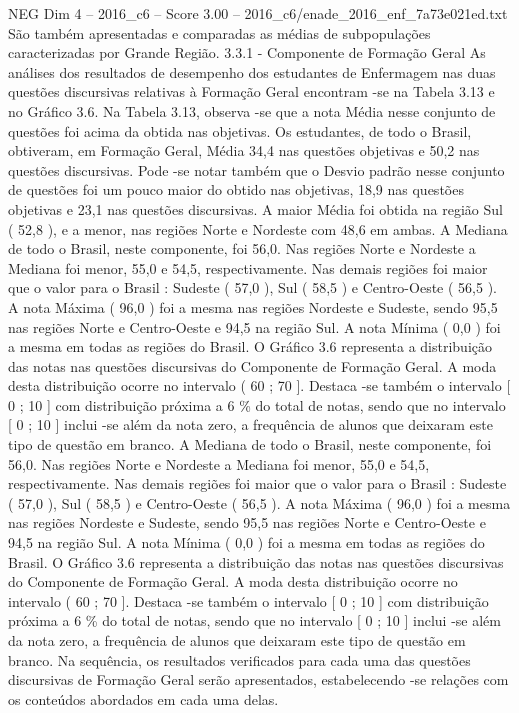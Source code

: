 \begin{textsample}{NEG Dim 4 – 2016\_c6 – Score 3.00 – 2016\_c6/enade\_2016\_enf\_7a73e021ed.txt}
São também apresentadas e comparadas as médias de subpopulações caracterizadas por Grande Região. 3.3.1 - Componente de Formação Geral As análises dos resultados de desempenho dos estudantes de Enfermagem nas duas questões discursivas relativas à Formação Geral encontram -se na Tabela 3.13 e no Gráfico 3.6.
Na Tabela 3.13, observa -se que a nota Média nesse conjunto de questões foi acima da obtida nas objetivas.
Os estudantes, de todo o Brasil, obtiveram, em Formação Geral, Média 34,4 nas questões objetivas e 50,2 nas questões discursivas.
Pode -se notar também que o Desvio padrão nesse conjunto de questões foi um pouco maior do obtido nas objetivas, 18,9 nas questões objetivas e 23,1 nas questões discursivas.
A maior Média foi obtida na região Sul ( 52,8 ), e a menor, nas regiões Norte e Nordeste com 48,6 em ambas.
A Mediana de todo o Brasil, neste componente, foi 56,0.
Nas regiões Norte e Nordeste a Mediana foi menor, 55,0 e 54,5, respectivamente.
Nas demais regiões foi maior que o valor para o Brasil : Sudeste ( 57,0 ), Sul ( 58,5 ) e Centro-Oeste ( 56,5 ).
A nota Máxima ( 96,0 ) foi a mesma nas regiões Nordeste e Sudeste, sendo 95,5 nas regiões Norte e Centro-Oeste e 94,5 na região Sul.
A nota Mínima ( 0,0 ) foi a mesma em todas as regiões do Brasil.
O Gráfico 3.6 representa a distribuição das notas nas questões discursivas do Componente de Formação Geral.
A moda desta distribuição ocorre no intervalo ( 60 ; 70 ].
Destaca -se também o intervalo [ 0 ; 10 ] com distribuição próxima a 6 \% do total de notas, sendo que no intervalo [ 0 ; 10 ] inclui -se além da nota zero, a frequência de alunos que deixaram este tipo de questão em branco.
A Mediana de todo o Brasil, neste componente, foi 56,0.
Nas regiões Norte e Nordeste a Mediana foi menor, 55,0 e 54,5, respectivamente.
Nas demais regiões foi maior que o valor para o Brasil : Sudeste ( 57,0 ), Sul ( 58,5 ) e Centro-Oeste ( 56,5 ).
A nota Máxima ( 96,0 ) foi a mesma nas regiões Nordeste e Sudeste, sendo 95,5 nas regiões Norte e Centro-Oeste e 94,5 na região Sul.
A nota Mínima ( 0,0 ) foi a mesma em todas as regiões do Brasil.
O Gráfico 3.6 representa a distribuição das notas nas questões discursivas do Componente de Formação Geral.
A moda desta distribuição ocorre no intervalo ( 60 ; 70 ].
Destaca -se também o intervalo [ 0 ; 10 ] com distribuição próxima a 6 \% do total de notas, sendo que no intervalo [ 0 ; 10 ] inclui -se além da nota zero, a frequência de alunos que deixaram este tipo de questão em branco.
Na sequência, os resultados verificados para cada uma das questões discursivas de Formação Geral serão apresentados, estabelecendo -se relações com os conteúdos abordados em cada uma delas.

\end{textsample}

